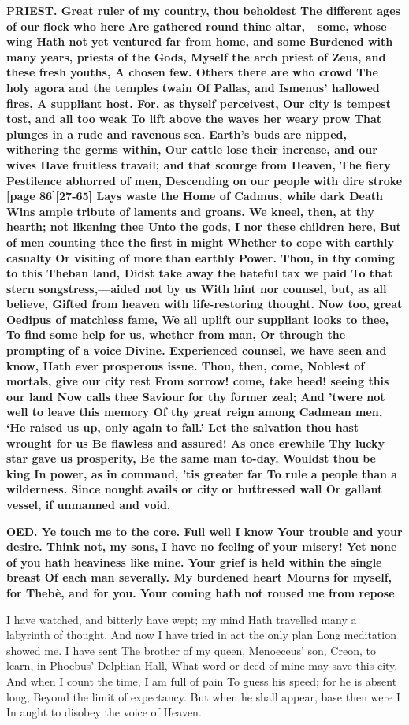 \documentclass[11pt,letter]{book}
\begin{document}
\par \textbf{PRIEST. Great ruler of my country, thou beholdest The different ages of our flock who here Are gathered round thine altar,—some, whose wing Hath not yet ventured far from home, and some Burdened with many years, priests of the Gods, Myself the arch priest of Zeus, and these fresh youths, A chosen few. Others there are who crowd The holy agora and the temples twain Of Pallas, and Ismenus’ hallowed fires, A suppliant host. For, as thyself perceivest, Our city is tempest tost, and all too weak To lift above the waves her weary prow That plunges in a rude and ravenous sea. Earth’s buds are nipped, withering the germs within, Our cattle lose their increase, and our wives Have fruitless travail; and that scourge from Heaven, The fiery Pestilence abhorred of men, Descending on our people with dire stroke [page 86][27-65] Lays waste the Home of Cadmus, while dark Death Wins ample tribute of laments and groans. We kneel, then, at thy hearth; not likening thee Unto the gods, I nor these children here, But of men counting thee the first in might Whether to cope with earthly casualty Or visiting of more than earthly Power. Thou, in thy coming to this Theban land, Didst take away the hateful tax we paid To that stern songstress,—aided not by us With hint nor counsel, but, as all believe, Gifted from heaven with life-restoring thought. Now too, great Oedipus of matchless fame, We all uplift our suppliant looks to thee, To find some help for us, whether from man, Or through the prompting of a voice Divine. Experienced counsel, we have seen and know, Hath ever prosperous issue. Thou, then, come, Noblest of mortals, give our city rest From sorrow! come, take heed! seeing this our land Now calls thee Saviour for thy former zeal; And ’twere not well to leave this memory Of thy great reign among Cadmean men, ‘He raised us up, only again to fall.’ Let the salvation thou hast wrought for us Be flawless and assured! As once erewhile Thy lucky star gave us prosperity, Be the same man to-day. Wouldst thou be king In power, as in command, ’tis greater far To rule a people than a wilderness. Since nought avails or city or buttressed wall Or gallant vessel, if unmanned and void.}
\par 

\par \textbf{OED. Ye touch me to the core. Full well I know Your trouble and your desire. Think not, my sons, I have no feeling of your misery! Yet none of you hath heaviness like mine. Your grief is held within the single breast Of each man severally. My burdened heart Mourns for myself, for Thebè, and for you. Your coming hath not roused me from repose}
\par   [page 87][66-102] I have watched, and bitterly have wept; my mind Hath travelled many a labyrinth of thought. And now I have tried in act the only plan Long meditation showed me. I have sent The brother of my queen, Menoeceus’ son, Creon, to learn, in Phoebus’ Delphian Hall, What word or deed of mine may save this city. And when I count the time, I am full of pain To guess his speed; for he is absent long, Beyond the limit of expectancy. But when he shall appear, base then were I In aught to disobey the voice of Heaven.
\end{document}
